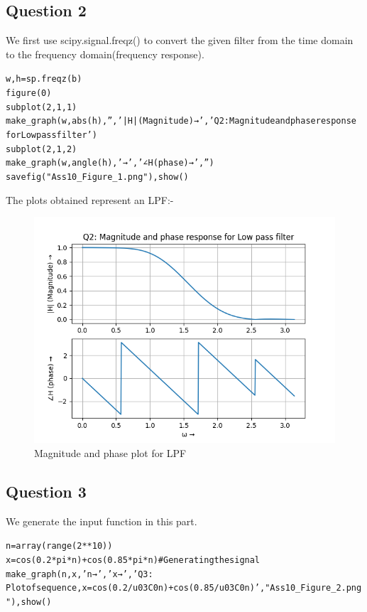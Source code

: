 \documentclass{article}
\begin{document}
\subsection{Question 2}
We first use scipy.signal.freqz() to convert the given filter from the time domain to the frequency domain(frequency response). 
\begin{alltt}
w, h = sp.freqz(b)
figure(0)
subplot(2, 1, 1)
make_graph(w,abs(h),'','|H| (Magnitude) →', 'Q2: Magnitude and phase response 
for Low pass filter')
subplot(2, 1, 2)
make_graph(w, angle(h), '\omega →', '∠H (phase) →' , '')
savefig("Ass10_Figure_1.png"), show()
\end{alltt}
The plots obtained represent an LPF:-
\begin{figure}[h!]
\centering
\includegraphics[scale=0.6]{Ass10_Figure_1.png}
\caption{Magnitude and phase plot for LPF}
\label{fig:universe}
\end{figure}


\subsection{Question 3}
We generate the input function in this part.
\begin{alltt}
n = array(range(2**10))
x = cos(0.2*pi*n) + cos(0.85*pi*n) # Generating the signal 
make_graph(n, x, 'n →', 'x →', 'Q3: 
Plot of sequence, x = cos(0.2/u03C0n) + cos(0.85/u03C0n)', "Ass10_Figure_2.png"), show()
\end{alltt}
\end{document}
